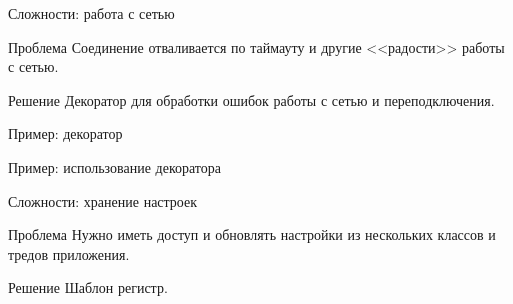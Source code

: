 \documentclass{beamer}
\begin{document}
\begin{frame}{Сложности: работа с сетью}

\begin{block}{Проблема}
Соединение отваливается по таймауту и другие <<радости>> работы с сетью.
\end{block}

\begin{block}{Решение}
Декоратор для обработки ошибок работы с сетью и переподключения.
\end{block}
\end{frame}

\begin{frame}{Пример: декоратор}

\end{frame}


\begin{frame}{Пример: использование декоратора}

\end{frame}


\begin{frame}{Сложности: хранение настроек}

\begin{block}{Проблема}
Нужно иметь доступ и обновлять настройки из нескольких классов и тредов приложения.
\end{block}

\begin{block}{Решение}
Шаблон регистр.
\end{block}
\end{frame}
\end{document}
